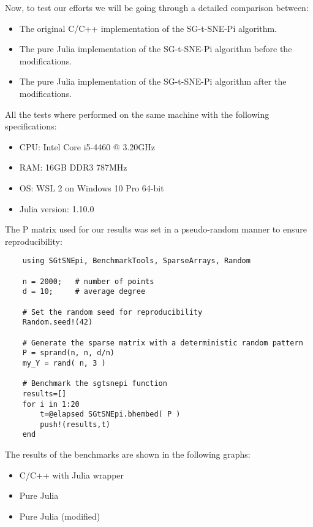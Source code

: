Now, to test our efforts we will be going through a detailed comparison between:
\begin{itemize}
    \item The original C/C++ implementation of the SG-t-SNE-Pi algorithm.
    \item The pure Julia implementation of the SG-t-SNE-Pi algorithm before the modifications.
    \item The pure Julia implementation of the SG-t-SNE-Pi algorithm after the modifications.
\end{itemize}
All the tests where performed on the same machine with the following specifications:
\begin{itemize}
    \item CPU: Intel Core i5-4460 @ 3.20GHz
    \item RAM: 16GB DDR3 787MHz
    \item OS: WSL 2 on Windows 10 Pro 64-bit
    \item Julia version: 1.10.0
\end{itemize}
The P matrix used for our results was set in a pseudo-random manner to ensure reproducibility:
\begin{verbatim} 
    using SGtSNEpi, BenchmarkTools, SparseArrays, Random
    
    n = 2000;   # number of points
    d = 10;     # average degree
    
    # Set the random seed for reproducibility
    Random.seed!(42)
    
    # Generate the sparse matrix with a deterministic random pattern
    P = sprand(n, n, d/n)
    my_Y = rand( n, 3 )

    # Benchmark the sgtsnepi function
    results=[]
    for i in 1:20
        t=@elapsed SGtSNEpi.bhembed( P )
        push!(results,t)
    end
\end{verbatim}
The results of the benchmarks are shown in the following graphs:
\begin{itemize}
    \item C/C++ with Julia wrapper

    \item Pure Julia 

    \item Pure Julia (modified)

\end{itemize}
